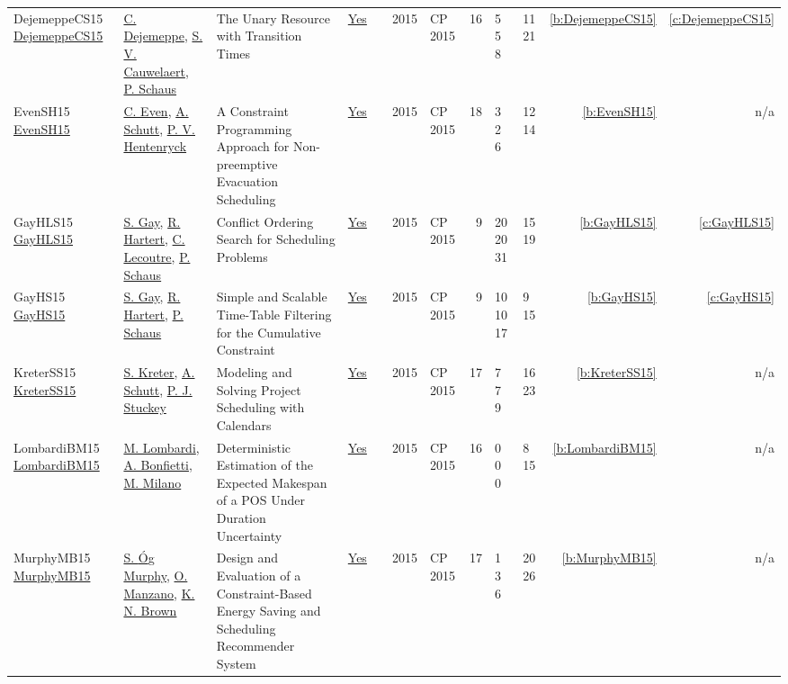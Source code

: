 {\begin{longtable}{>{\raggedright\arraybackslash}p{3cm}>{\raggedright\arraybackslash}p{4.5cm}>{\raggedright\arraybackslash}p{6.0cm}rrrp{2.5cm}rp{1cm}p{1cm}rr}
DejemeppeCS15 \href{https://doi.org/10.1007/978-3-319-23219-5_7}{DejemeppeCS15} & \hyperref[auth:a202]{C. Dejemeppe}, \hyperref[auth:a201]{S. V. Cauwelaert}, \hyperref[auth:a147]{P. Schaus} & The Unary Resource with Transition Times & \href{../works/DejemeppeCS15.pdf}{Yes} & \cite{DejemeppeCS15} & 2015 & CP 2015 & 16 & 5 5 8 & 11 21 & \ref{b:DejemeppeCS15} & \ref{c:DejemeppeCS15}\\
EvenSH15 \href{https://doi.org/10.1007/978-3-319-23219-5_40}{EvenSH15} & \hyperref[auth:a214]{C. Even}, \hyperref[auth:a124]{A. Schutt}, \hyperref[auth:a148]{P. V. Hentenryck} & \cellcolor{green!10}A Constraint Programming Approach for Non-preemptive Evacuation Scheduling & \href{../works/EvenSH15.pdf}{Yes} & \cite{EvenSH15} & 2015 & CP 2015 & 18 & 3 2 6 & 12 14 & \ref{b:EvenSH15} & n/a\\
GayHLS15 \href{https://doi.org/10.1007/978-3-319-23219-5_10}{GayHLS15} & \hyperref[auth:a211]{S. Gay}, \hyperref[auth:a212]{R. Hartert}, \hyperref[auth:a213]{C. Lecoutre}, \hyperref[auth:a147]{P. Schaus} & \cellcolor{green!10}Conflict Ordering Search for Scheduling Problems & \href{../works/GayHLS15.pdf}{Yes} & \cite{GayHLS15} & 2015 & CP 2015 & 9 & 20 20 31 & 15 19 & \ref{b:GayHLS15} & \ref{c:GayHLS15}\\
GayHS15 \href{https://doi.org/10.1007/978-3-319-23219-5_11}{GayHS15} & \hyperref[auth:a211]{S. Gay}, \hyperref[auth:a212]{R. Hartert}, \hyperref[auth:a147]{P. Schaus} & \cellcolor{green!10}Simple and Scalable Time-Table Filtering for the Cumulative Constraint & \href{../works/GayHS15.pdf}{Yes} & \cite{GayHS15} & 2015 & CP 2015 & 9 & 10 10 17 & 9 15 & \ref{b:GayHS15} & \ref{c:GayHS15}\\
KreterSS15 \href{https://doi.org/10.1007/978-3-319-23219-5_19}{KreterSS15} & \hyperref[auth:a123]{S. Kreter}, \hyperref[auth:a124]{A. Schutt}, \hyperref[auth:a125]{P. J. Stuckey} & Modeling and Solving Project Scheduling with Calendars & \href{../works/KreterSS15.pdf}{Yes} & \cite{KreterSS15} & 2015 & CP 2015 & 17 & 7 7 9 & 16 23 & \ref{b:KreterSS15} & n/a\\
LombardiBM15 \href{https://doi.org/10.1007/978-3-319-23219-5_20}{LombardiBM15} & \hyperref[auth:a142]{M. Lombardi}, \hyperref[auth:a198]{A. Bonfietti}, \hyperref[auth:a143]{M. Milano} & Deterministic Estimation of the Expected Makespan of a {POS} Under Duration Uncertainty & \href{../works/LombardiBM15.pdf}{Yes} & \cite{LombardiBM15} & 2015 & CP 2015 & 16 & 0 0 0 & 8 15 & \ref{b:LombardiBM15} & n/a\\
MurphyMB15 \href{https://doi.org/10.1007/978-3-319-23219-5_47}{MurphyMB15} & \hyperref[auth:a215]{S. {\'{O}}g Murphy}, \hyperref[auth:a216]{O. Manzano}, \hyperref[auth:a217]{K. N. Brown} & Design and Evaluation of a Constraint-Based Energy Saving and Scheduling Recommender System & \href{../works/MurphyMB15.pdf}{Yes} & \cite{MurphyMB15} & 2015 & CP 2015 & 17 & 1 3 6 & 20 26 & \ref{b:MurphyMB15} & n/a\\

\end{longtable}}

